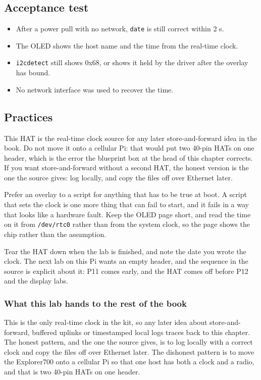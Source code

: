 \subsection*{Acceptance test}

\begin{itemize}
\item After a power pull with no network, \texttt{date} is still correct within 2 s.
\item The OLED shows the host name and the time from the real-time clock.
\item \texttt{i2cdetect} still shows 0x68, or shows it held by the driver after the overlay has bound.
\item No network interface was used to recover the time.
\end{itemize}

\subsection*{Practices}

This HAT is the real-time clock source for any later store-and-forward idea in the book. Do not move it onto a cellular Pi: that would put two 40-pin HATs on one header, which is the error the blueprint box at the head of this chapter corrects. If you want store-and-forward without a second HAT, the honest version is the one the source gives: log locally, and copy the files off over Ethernet later.

Prefer an overlay to a script for anything that has to be true at boot. A script that sets the clock is one more thing that can fail to start, and it fails in a way that looks like a hardware fault. Keep the OLED page short, and read the time on it from \texttt{/dev/rtc0} rather than from the system clock, so the page shows the chip rather than the assumption.

Tear the HAT down when the lab is finished, and note the date you wrote the clock. The next lab on this Pi wants an empty header, and the sequence in the source is explicit about it: P11 comes early, and the HAT comes off before P12 and the display labs.

\subsubsection*{What this lab hands to the rest of the book}

This is the only real-time clock in the kit, so any later idea about store-and-forward, buffered uplinks or timestamped local logs traces back to this chapter. The honest pattern, and the one the source gives, is to log locally with a correct clock and copy the files off over Ethernet later. The dishonest pattern is to move the Explorer700 onto a cellular Pi so that one host has both a clock and a radio, and that is two 40-pin HATs on one header.


